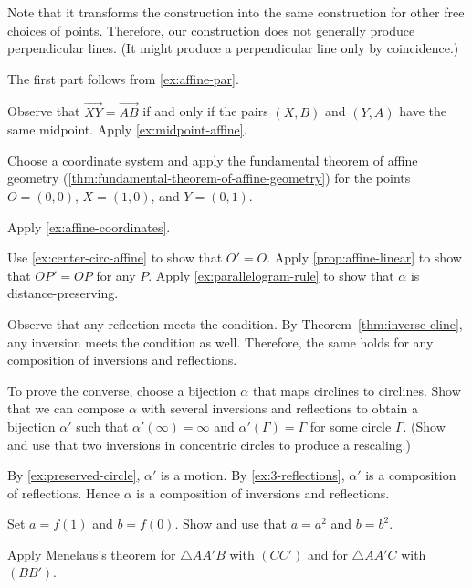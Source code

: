 Note that it transforms the construction into the same construction for other free choices of points.
Therefore, our construction does not generally produce perpendicular lines.
(It might produce a perpendicular line only by coincidence.)
 
The first part follows from \ref{ex:affine-par}.

Observe that $\overrightarrow{XY}=\overrightarrow{AB}$ if and only if
the pairs $(X,B)$ and $(Y,A)$ have the same midpoint.
Apply \ref{ex:midpoint-affine}.
 
Choose a coordinate system and apply the fundamental theorem of affine geometry (\ref{thm:fundamental-theorem-of-affine-geometry}) for the points $O=(0,0)$, $X=(1,0)$, and $Y=(0,1)$.

Apply \ref{ex:affine-coordinates}.

Use \ref{ex:center-circ-affine} to show that $O'=O$.
Apply \ref{prop:affine-linear} to show that $OP'=OP$ for any $P$.
Apply \ref{ex:parallelogram-rule} to show that $\alpha$ is distance-preserving.

Observe that any reflection meets the condition.
By Theorem~\ref{thm:inverse-cline}, any inversion meets the condition as well.
Therefore, the same holds for any composition of inversions and reflections.

To prove the converse, choose a bijection $\alpha$ that maps circlines to circlines.
Show that we can compose $\alpha$ with several inversions and reflections to obtain a bijection $\alpha'$ such that $\alpha'(\infty)=\infty$ and $\alpha'(\Gamma)=\Gamma$ for some circle $\Gamma$.
(Show and use that two inversions in concentric circles to produce a rescaling.)

By \ref{ex:preserved-circle}, $\alpha'$ is a motion.
By \ref{ex:3-reflections}, $\alpha'$ is a composition of reflections.
Hence $\alpha$ is a composition of inversions and reflections.

Set $a=f(1)$ and $b=f(0)$.
Show and use that $a=a^2$ and $b=b^2$.

 Apply Menelaus's theorem
for $\triangle AA'B$ with $(CC')$
and
for $\triangle AA'C$ with $(BB')$.

\setcounter{eqtn}{0}

